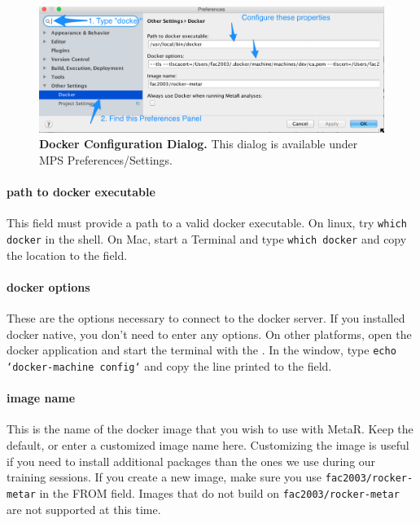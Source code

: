 \begin{figure}[h!tbp]
  \centering
  \includegraphics[width=\figWidthWide]{figures/DockerPreferencesDialog.png}
\caption[Docker Configuration Dialog.]{\textbf{Docker Configuration Dialog.} This dialog is available under MPS Preferences/Settings.}
\label{fig:DockerPreferencesDialog}
\end{figure}

\paragraph{path to docker executable}
This field must provide a path to a valid docker executable. On linux, try \texttt{which docker} in the shell. On Mac, start a Terminal and type \texttt{which docker} and copy the location to the field. 

\paragraph{docker options}
These are the options necessary to connect to the docker server. If you installed  docker native, you don't need to enter any options.  On other platforms, open the docker application and start the terminal with the \allowbreak{}. In the window, type \texttt{echo `docker-machine config`} and copy the line printed to the field. 


\paragraph{image name}
This is the name of the docker image that you wish to use with MetaR. Keep the default, or enter a customized image name here. Customizing the image is useful if you need to install additional packages than the ones we use during our training sessions. If you create a new image, make sure you use \texttt{fac2003/rocker-metar} in the FROM field. Images that do not build on \texttt{fac2003/rocker-metar} are not supported at this time. 


